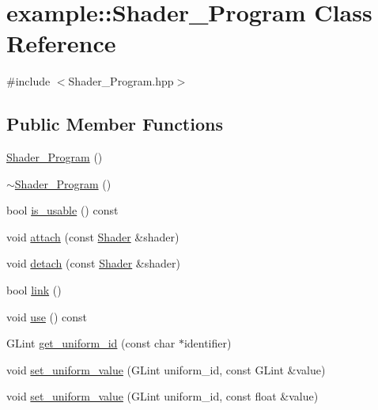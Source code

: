 \hypertarget{classexample_1_1_shader___program}{}\section{example\+:\+:Shader\+\_\+\+Program Class Reference}
\label{classexample_1_1_shader___program}


{\ttfamily \#include $<$Shader\+\_\+\+Program.\+hpp$>$}

\subsection*{Public Member Functions}
\begin{DoxyCompactItemize}
\item 
\mbox{\hyperlink{classexample_1_1_shader___program_aa76001651ab84fda3d899a2b57f2a4b3}{Shader\+\_\+\+Program}} ()
\item 
\mbox{\hyperlink{classexample_1_1_shader___program_a39b461d067ffc3a10662e1d4fcb6d689}{$\sim$\+Shader\+\_\+\+Program}} ()
\item 
bool \mbox{\hyperlink{classexample_1_1_shader___program_ae76d165cf329883dfc287b37ecc313c2}{is\+\_\+usable}} () const
\item 
void \mbox{\hyperlink{classexample_1_1_shader___program_ab4b58aa69e6a4afc44e63a660b0e59b0}{attach}} (const \mbox{\hyperlink{classexample_1_1_shader}{Shader}} \&shader)
\item 
void \mbox{\hyperlink{classexample_1_1_shader___program_a83c1ac06873858589f454c5dfaa7b00c}{detach}} (const \mbox{\hyperlink{classexample_1_1_shader}{Shader}} \&shader)
\item 
bool \mbox{\hyperlink{classexample_1_1_shader___program_a6cf9a8d19d6c43210aaf5a51c036d214}{link}} ()
\item 
void \mbox{\hyperlink{classexample_1_1_shader___program_a70c29ba798a57a71ca2b74463f5ffe19}{use}} () const
\item 
G\+Lint \mbox{\hyperlink{classexample_1_1_shader___program_a03a790d8c22cbe1d6b0c9a1857a13a0e}{get\+\_\+uniform\+\_\+id}} (const char $\ast$identifier)
\item 
void \mbox{\hyperlink{classexample_1_1_shader___program_a7a40f28185d128a50c2fa398397b7a05}{set\+\_\+uniform\+\_\+value}} (G\+Lint uniform\+\_\+id, const G\+Lint \&value)
\item 
void \mbox{\hyperlink{classexample_1_1_shader___program_a55bc4282ec8472d1794c5f7d48d5ff4b}{set\+\_\+uniform\+\_\+value}} (G\+Lint uniform\+\_\+id, const float \&value)

\end{DoxyCompactItemize}
